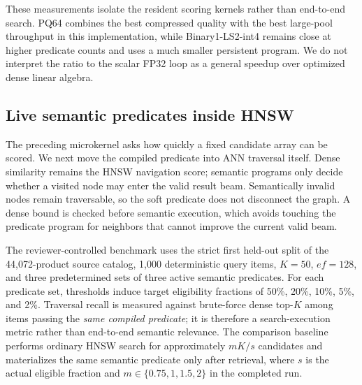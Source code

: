 These measurements isolate the resident scoring kernels rather than end-to-end search. PQ64 combines the best compressed quality with the best large-pool throughput in this implementation, while Binary1-LS2-int4 remains close at higher predicate counts and uses a much smaller persistent program. We do not interpret the ratio to the scalar FP32 loop as a general speedup over optimized dense linear algebra.

\subsection{Live semantic predicates inside HNSW}
The preceding microkernel asks how quickly a fixed candidate array can be scored. We next move the compiled predicate into ANN traversal itself. Dense similarity remains the HNSW navigation score; semantic programs only decide whether a visited node may enter the valid result beam. Semantically invalid nodes remain traversable, so the soft predicate does not disconnect the graph. A dense bound is checked before semantic execution, which avoids touching the predicate program for neighbors that cannot improve the current valid beam.

The reviewer-controlled benchmark uses the strict first held-out split of the 44,072-product source catalog, 1,000 deterministic query items, $K=50$, $ef=128$, and three predetermined sets of three active semantic predicates. For each predicate set, thresholds induce target eligibility fractions of 50\%, 20\%, 10\%, 5\%, and 2\%. Traversal recall is measured against brute-force dense top-$K$ among items passing the \emph{same compiled predicate}; it is therefore a search-execution metric rather than end-to-end semantic relevance. The comparison baseline performs ordinary HNSW search for approximately $mK/s$ candidates and materializes the same semantic predicate only after retrieval, where $s$ is the actual eligible fraction and $m\in\{0.75,1,1.5,2\}$ in the completed run.


